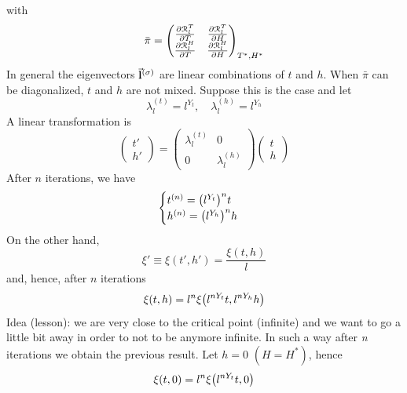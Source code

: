 \documentclass[../main/main.tex]{subfiles}
\begin{document}
with
\begin{equation}
  \bar{\pi } =
  \begin{pmatrix}
     \pdv{\mathcal{R}_l^T}{T} & \pdv{\mathcal{R}_l^T}{H} \\
     \pdv{\mathcal{R}_l^H}{T} & \pdv{\mathcal{R}_l^H}{H}
  \end{pmatrix}_{T^*,H^*}
\end{equation}
In general the eigenvectors \( \va{l}^{(\sigma )} \) are linear combinations of \( t \) and \( h \). When \( \bar{\pi }  \) can be diagonalized, \( t \) and \( h \) are not mixed. Suppose this is the case and let
\begin{equation}
  \lambda _l ^{(t)} = l^{Y_t}, \quad \lambda _l^{(h)} = l ^{Y_h}
\end{equation}
A linear transformation is
\begin{equation}
  \begin{pmatrix}
  t' \\
  h'
  \end{pmatrix}
  =
  \begin{pmatrix}
  \lambda _l^{(t)}   & 0 \\
    0 & \lambda _l^{(h)}
  \end{pmatrix}
  \begin{pmatrix}
  t \\
  h
  \end{pmatrix}
\end{equation}
After \( n \) iterations, we have
\begin{equation}
  \begin{cases}
   t^{(n)} = \qty(l^{Y_t})^n t  \\
  h^{(n)} = \qty(l^{Y_h})^n h
  \end{cases}
\end{equation}
On the other hand,
\begin{equation}
  \xi ' \equiv \xi (t',h') = \frac{\xi (t,h)}{l}
\end{equation}
and, hence, after \( n \) iterations
\begin{equation}
  \xi (t,h) = l^n \xi \qty(l^{n Y_t} t, l^{n Y_h} h)
\end{equation}
Idea (lesson): we are very close to the critical point (infinite) and we want to go a little bit away in order to not to be anymore infinite. In such a way after \emph{n} iterations we obtain the previous result.
Let \( h=0 \) \( (H=H^*) \), hence
\begin{equation}
  \xi (t,0) = l^n \xi \qty(l^{n Y_t} t , 0)
\end{equation}
\end{document}

